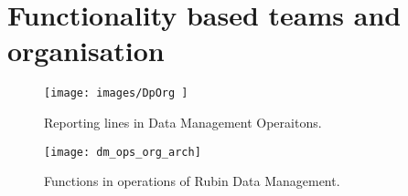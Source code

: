 \section{Functionality based teams and organisation} \label{sec:org}

\begin{figure}
\begin{centering}
\texttt{[image: images/DpOrg ]}
	\caption{Reporting lines in Data Management Operaitons.
\label{fig:org}}
\end{centering}
\end{figure}

\begin{figure}
\begin{centering}
\texttt{[image: dm\_ops\_org\_arch]}
\caption{Functions in operations of Rubin Data Management.\label{fig:arcorg}}
\end{centering}
\end{figure}

